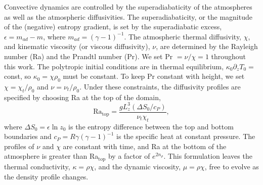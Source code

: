 \documentclass[aps, prl, twocolumn, nofootinbib, groupedaddress, amsfonts, amssymb, amsmath]{revtex4-1}
\begin{document}
Convective dynamics are controlled by the superadiabaticity
of the atmospheres as well as the atmospheric diffusivities.
The superadiabaticity, or the magnitude of the (negative) 
entropy gradient, is set by 
the superadiabatic excess, $\epsilon = m_{ad} - m$, where 
$m_{ad} = (\gamma - 1)^{-1}$.
The atmospheric thermal diffusivity, $\chi$,
and kinematic viscosity (or viscous diffusivity), $\nu$,
are determined by the Rayleigh number (Ra) and the Prandtl
number (Pr).  We set $\text{Pr } = \nu/\chi = 1$ throughout
this work. The polytropic initial conditions are in
thermal equilibrium, $\kappa_0 \partial_z T_0 =$ const,
so $\kappa_0 = \chi \rho_0$ must be constant. To keep
Pr constant with height, we set $\chi = \chi_t/\rho_0$
and $\nu = \nu_t/\rho_0$.  Under these constraints, the
diffusivity profiles are specified by choosing Ra
at the top of the domain,
\begin{equation}
\text{Ra}_{\text{top}} = \frac{g L_z^3 (\Delta S_0 / c_P)}{\nu_t\chi_t},
\end{equation}
where $\Delta S_0 = \epsilon\ln z_0$ is the entropy difference 
between the top and bottom boundaries and
$c_P = R\gamma(\gamma-1)^{-1}$ is the specific heat 
at constant pressure. The profiles of $\nu$ and $\chi$ are constant with
time, and Ra at the bottom of the atmosphere is greater than Ra$_{\text{top}}$
by a factor of $e^{2n_{\rho}}$.  This formulation leaves
the thermal conductivity, $\kappa = \rho\chi$, and
the dynamic viscosity, $\mu = \rho\chi$, free to evolve
as the density profile changes.
\end{document}
